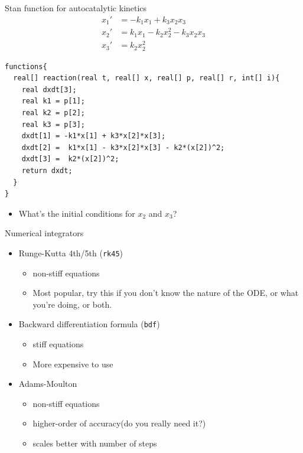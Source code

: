 \documentclass[presentation]{beamer}
\begin{document}
\begin{frame}[fragile,label={sec:org8ccdddc}]{Stan function for autocatalytic kinetics}
 \begin{align*}
x_1' &= -k_1x_1 + k_3x_2x_3\\
x_2' &=  k_1x_1 - k_2x_2^2 - k_3x_2x_3\\
x_3' &=  k_2x_2^2
\end{align*}

\begin{verbatim}
functions{
  real[] reaction(real t, real[] x, real[] p, real[] r, int[] i){
    real dxdt[3];
    real k1 = p[1];
    real k2 = p[2];
    real k3 = p[3];
    dxdt[1] = -k1*x[1] + k3*x[2]*x[3];
    dxdt[2] =  k1*x[1] - k3*x[2]*x[3] - k2*(x[2])^2;
    dxdt[3] =  k2*(x[2])^2;
    return dxdt;
  }
}
\end{verbatim}
\begin{itemize}
\item What's the initial conditions for \(x_2\) and \(x_3\)?
\end{itemize}
\end{frame}

\begin{frame}[fragile,label={sec:orgb7fb5e6}]{Numerical integrators}
 \begin{itemize}
\item Runge-Kutta 4th/5th (\texttt{rk45})
\begin{itemize}
\item non-stiff equations
\item Most popular, try this if you don't know the nature of the ODE, or what you're doing, or both.
\end{itemize}
\item Backward differentiation formula (\texttt{bdf})
\begin{itemize}
\item stiff equations
\item More expensive to use
\end{itemize}
\item Adams-Moulton
\begin{itemize}
\item non-stiff equations
\item higher-order of accuracy(do you really need it?)
\item scales better with number of steps
\end{itemize}
\end{itemize}
\end{frame}
\end{document}
